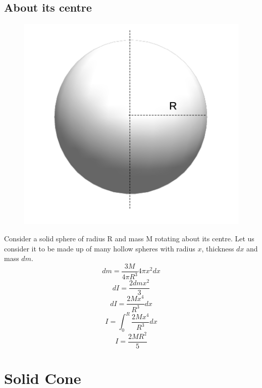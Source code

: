 \documentclass{article}
\begin{document}
\subsection{About its centre}
\begin{figure}[h!]
  \includegraphics[scale=0.3]{sphere.png}
  \centering
\end{figure}
Consider a solid sphere of radius R and mass M rotating about its centre.
Let us consider it to be made up of many hollow spheres with radius $x$, thickness $dx$ and mass $dm$.
$$dm = \frac{3M}{4\pi R^3} 4\pi x^2 dx$$
$$dI = \frac{2dmx^2}{3}$$
$$dI = \frac{2Mx^4}{R^3} dx$$
$$I = \int_0^R \frac{2Mx^4}{R^3} dx$$
$$\boxed{I = \frac{2MR^2}{5}}$$

\section{Solid Cone}
\end{document}

